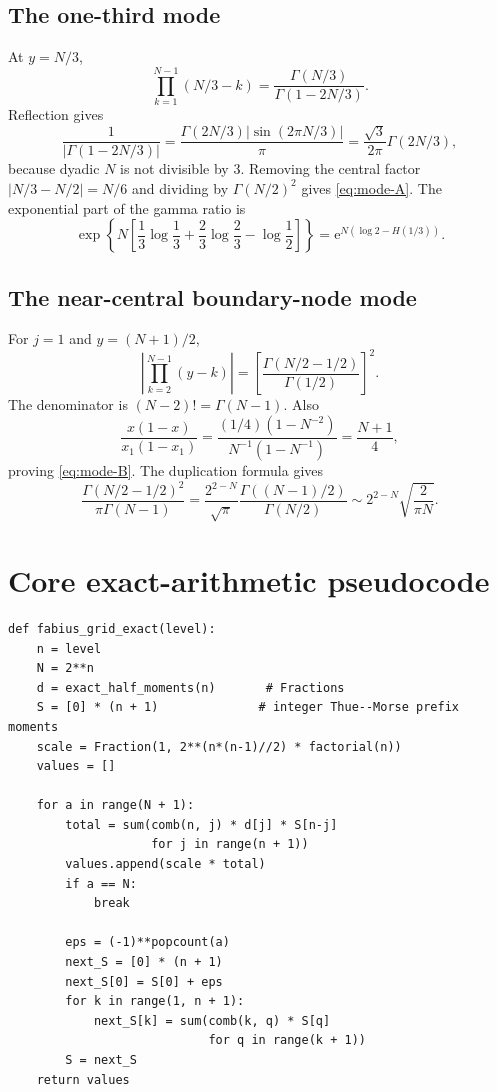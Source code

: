 \documentclass[11pt,oneside]{article}
\theoremstyle{definition}
\theoremstyle{remark}
\newcommand{\e}{\mathrm e}
\begin{document}
\subsection{The one-third mode}

At $y=N/3$,
\[
 \prod_{k=1}^{N-1}(N/3-k)
 =\frac{\Gamma(N/3)}{\Gamma(1-2N/3)}.
\]
Reflection gives
\[
 \frac{1}{|\Gamma(1-2N/3)|}
 =\frac{\Gamma(2N/3)|\sin(2\pi N/3)|}{\pi}
 =\frac{\sqrt3}{2\pi}\Gamma(2N/3),
\]
because dyadic $N$ is not divisible by $3$.  Removing the central factor
$|N/3-N/2|=N/6$ and dividing by $\Gamma(N/2)^2$ gives \eqref{eq:mode-A}.
The exponential part of the gamma ratio is
\[
 \exp\!\left\{N\left[
 \frac13\log\frac13+\frac23\log\frac23-\log\frac12
 \right]\right\}
 =\e^{N(\log2-H(1/3))}.
\]

\subsection{The near-central boundary-node mode}

For $j=1$ and $y=(N+1)/2$,
\[
 \left|\prod_{k=2}^{N-1}(y-k)\right|
 =\left[\frac{\Gamma(N/2-1/2)}{\Gamma(1/2)}\right]^2.
\]
The denominator is $(N-2)!=\Gamma(N-1)$.  Also
\[
 \frac{x(1-x)}{x_1(1-x_1)}
 =\frac{(1/4)(1-N^{-2})}{N^{-1}(1-N^{-1})}
 =\frac{N+1}{4},
\]
proving \eqref{eq:mode-B}.  The duplication formula gives
\[
 \frac{\Gamma(N/2-1/2)^2}{\pi\Gamma(N-1)}
 =\frac{2^{2-N}}{\sqrt\pi}
 \frac{\Gamma((N-1)/2)}{\Gamma(N/2)}
 \sim2^{2-N}\sqrt{\frac{2}{\pi N}}.
\]

\section{Core exact-arithmetic pseudocode}
\label{app:algorithm}

\begin{lstlisting}[style=pythonstyle,caption={Streaming the exact dyadic Fabius comb.}]
def fabius_grid_exact(level):
    n = level
    N = 2**n
    d = exact_half_moments(n)       # Fractions
    S = [0] * (n + 1)              # integer Thue--Morse prefix moments
    scale = Fraction(1, 2**(n*(n-1)//2) * factorial(n))
    values = []

    for a in range(N + 1):
        total = sum(comb(n, j) * d[j] * S[n-j]
                    for j in range(n + 1))
        values.append(scale * total)
        if a == N:
            break

        eps = (-1)**popcount(a)
        next_S = [0] * (n + 1)
        next_S[0] = S[0] + eps
        for k in range(1, n + 1):
            next_S[k] = sum(comb(k, q) * S[q]
                            for q in range(k + 1))
        S = next_S
    return values
\end{lstlisting}
\end{document}
